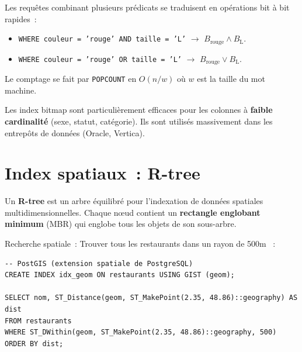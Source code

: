 \begin{proposition}
Les requ\^etes combinant plusieurs pr\'edicats se traduisent en
op\'erations bit \`a bit rapides~:
\begin{itemize}
  \item \texttt{WHERE couleur = 'rouge' AND taille = 'L'} $\to$ $B_{\text{rouge}} \wedge B_{\text{L}}$.
  \item \texttt{WHERE couleur = 'rouge' OR taille = 'L'} $\to$ $B_{\text{rouge}} \vee B_{\text{L}}$.
\end{itemize}
Le comptage se fait par \texttt{POPCOUNT} en $O(n/w)$ o\`u $w$ est la taille
du mot machine.
\end{proposition}

\begin{remarque}
Les index bitmap sont particuli\`erement efficaces pour les colonnes \`a
\textbf{faible cardinalit\'e} (sexe, statut, cat\'egorie). Ils sont
utilis\'es massivement dans les entrep\^ots de donn\'ees (Oracle, Vertica).
\end{remarque}

\section{Index spatiaux~: R-tree}

\begin{definition}[R-tree]
Un \textbf{R-tree} est un arbre \'equilibr\'e pour l'indexation de donn\'ees
spatiales multidimensionnelles. Chaque n\oe ud contient un \textbf{rectangle
englobant minimum} (MBR) qui englobe tous les objets de son sous-arbre.
\end{definition}

\begin{exemple}
Recherche spatiale~: \og Trouver tous les restaurants dans un rayon de
500m \fg~:
\begin{verbatim}
-- PostGIS (extension spatiale de PostgreSQL)
CREATE INDEX idx_geom ON restaurants USING GIST (geom);

SELECT nom, ST_Distance(geom, ST_MakePoint(2.35, 48.86)::geography) AS dist
FROM restaurants
WHERE ST_DWithin(geom, ST_MakePoint(2.35, 48.86)::geography, 500)
ORDER BY dist;
\end{verbatim}
\end{exemple}

